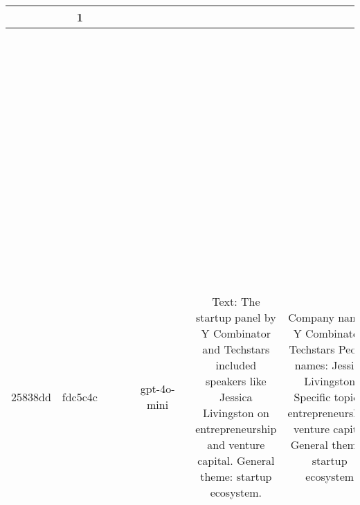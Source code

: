 \begin{table}[h!]
\begin{tabular}{|c|c|c|c|c|c|c|c|c|c|}
{ERR & 1\\
\hline
25838dd & fdc5c4c &  &  & gpt-4o-mini & Text: The startup panel by Y Combinator and Techstars included speakers like Jessica Livingston on entrepreneurship and venture capital. General theme: startup ecosystem. & Company names: Y Combinator, Techstars  
People names: Jessica Livingston  
Specific topics: entrepreneurship, venture capital  
General themes: startup ecosystem & ok & The output from the chatbot is structured according to the desired format specified in the description. It includes separate sections for "Company names," "People names," "Specific topics," and "General themes." Each section contains a comma-separated list as required. There are no apparent violations of the format or structure as stipulated by the description. Therefore, the output complies with the chatbot's description.

No violation.
OK & 1\\
\hline
25838dd & fdc5c4c &  &  & qwen2.5:3b & Text: The startup panel by Y Combinator and Techstars included speakers like Jessica Livingston on entrepreneurship and venture capital. General theme: startup ecosystem. & Based on the provided text, here is the structured output in the desired format:

```
Company names: Y Combinator, Techstars

People names: -||-

Specific topics:
- Jessica Livingston (speaker)
- Entrepreneurship
- Venture capital
- Startups
- Startup panel

General themes:
- Startup ecosystem
``` & err & The chatbot output partly follows the prescribed format but not entirely. Here is the evaluation:

1. **Company names**: The chatbot correctly lists company names, with two companies correctly separated by commas.

2. **People names**: The chatbot uses '-||-' as desired when there are no people names to list. However, there is a violation here because "Jessica Livingston" is mentioned under specific topics with an indication that she is a speaker, implying it should be listed under People names if it fits the intended listing category. Without the input, it's not possible to assess if Jessica Livingston should be there, assume it should be given such indications.

3. **Specific topics**: The specific topics are listed with markdown bullet points, which violates the required format of having a comma-separated list. Additionally, using "-||-" is not followed when specific topics are listed which also shows non-compliance if specific topics were there, it should be a comma-separated list according to the desired format.

}
\end{tabular}
\end{table}
